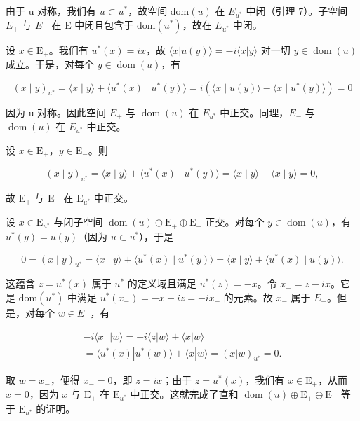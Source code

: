 由于 u 对称，我们有 \(u \subset u^{*}\)，故空间 \(\text{dom}(u)\) 在 \(E_{u^{*}}\) 中闭（引理 7）。子空间 \(E_{+}\) 与 \(E_{-}\) 在 E 中闭且包含于 \(\text{dom}(u^{*})\)，故在 \(E_{u^{*}}\) 中闭。

设 \(x \in \mathrm{E}_{+}\)。我们有 \(u^{*}(x) = ix\)，故 \(\langle x | u(y) \rangle = -i\langle x | y \rangle\) 对一切 \(y \in \operatorname{dom}(u)\) 成立。于是，对每个 \(y \in \operatorname{dom}(u)\)，有

\[
(x \mid y) _ {u ^ {*}} = \langle x \mid y \rangle + \langle u ^ {*} (x) \mid u ^ {*} (y) \rangle = i (\langle x \mid u (y) \rangle - \langle x \mid u ^ {*} (y) \rangle) = 0
\]

因为 u 对称。因此空间 \(E_{+}\) 与 \(\operatorname{dom}(u)\) 在 \(E_{u^{*}}\) 中正交。同理，\(E_{-}\) 与 \(\operatorname{dom}(u)\) 在 \(E_{u^{*}}\) 中正交。

设 \(x \in \mathrm{E}_{+}\)，\(y \in \mathrm{E}_{-}\)。则

\[
(x \mid y) _ {u ^ {*}} = \langle x \mid y \rangle + \langle u ^ {*} (x) \mid u ^ {*} (y) \rangle = \langle x \mid y \rangle - \langle x \mid y \rangle = 0,
\]

故 \(\mathrm{E}_{+}\) 与 \(\mathrm{E}_{-}\) 在 \(\mathrm{E}_{u^{*}}\) 中正交。

设 \(x \in \mathrm{E}_{u^*}\) 与闭子空间 \(\operatorname{dom}(u) \oplus \mathrm{E}_+ \oplus \mathrm{E}_-\) 正交。对每个 \(y \in \operatorname{dom}(u)\)，有 \(u^*(y) = u(y)\)（因为 \(u \subset u^*\)），于是

\[
0 = (x \mid y) _ {u ^ {*}} = \langle x \mid y \rangle + \langle u ^ {*} (x) \mid u ^ {*} (y) \rangle = \langle x \mid y \rangle + \langle u ^ {*} (x) \mid u (y) \rangle .
\]

这蕴含 \(z = u^{*}(x)\) 属于 \(u^{*}\) 的定义域且满足 \(u^{*}(z) = -x\)。令 \(x_{-} = z - ix\)。它是 \(\text{dom}(u^{*})\) 中满足 \(u^{*}(x_{-}) = -x - iz = -ix_{-}\) 的元素。故 \(x_{-}\) 属于 \(E_{-}\)。但是，对每个 \(w \in E_{-}\)，有

\[
\begin{array}{c} - i \langle x _ {-} | w \rangle = - i \langle z | w \rangle + \langle x | w \rangle \\ = \langle u ^ {*} (x) | u ^ {*} (w) \rangle + \langle x | w \rangle = (x | w) _ {u ^ {*}} = 0. \end{array}
\]

取 \(w = x_{-}\)，便得 \(x_{-} = 0\)，即 \(z = ix\)；由于 \(z = u^{*}(x)\)，我们有 \(x \in \mathrm{E}_{+}\)，从而 \(x = 0\)，因为 \(x\) 与 \(\mathrm{E}_{+}\) 在 \(\mathrm{E}_{u^{*}}\) 中正交。这就完成了直和 \(\operatorname{dom}(u) \oplus \mathrm{E}_{+} \oplus \mathrm{E}_{-}\) 等于 \(\mathrm{E}_{u^{*}}\) 的证明。

